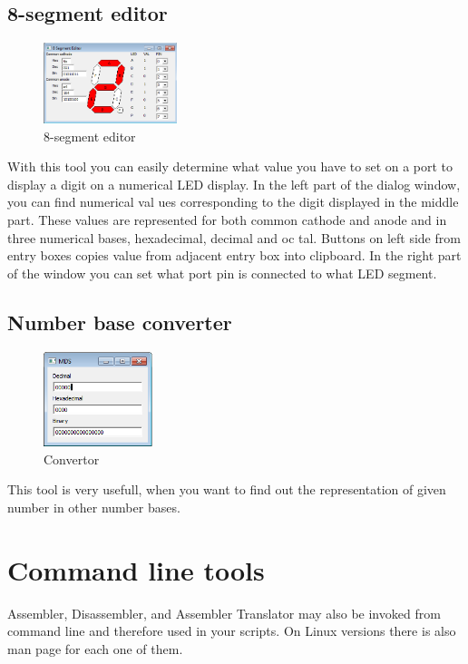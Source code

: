 \subsection{8-segment editor}
    \begin{figure}
        \centering{}
        \includegraphics[width=110pt]{img/8segment.png}
        \caption{8-segment editor}
    \end{figure}
    With this tool you can easily determine what value you have to set on a port to display a digit on a numerical LED display. In the left part of the dialog window, you can find numerical val ues corresponding to the digit displayed in the middle part. These values are represented for both common cathode and anode and in three numerical bases, hexadecimal, decimal and oc tal. Buttons on left side from entry boxes copies value from adjacent entry box into clipboard. In the right part of the window you can set what port pin is connected to what LED segment.

\subsection{Number base converter}
    \begin{figure}
            \centering
            \includegraphics[width=90pt]{img/convertor.png}
            \caption{Convertor}
    \end{figure}
    This tool is very usefull, when you want to find out the representation of given number in other number bases.


\section{Command line tools}
    Assembler, Disassembler, and Assembler Translator may also be invoked from command line and therefore used in your scripts.
    On Linux versions there is also man page for each one of them.
